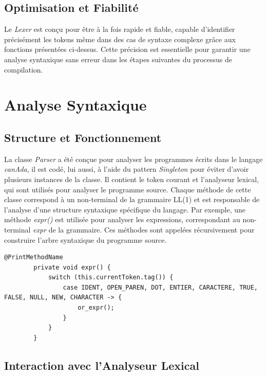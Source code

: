 \documentclass[french,a4paper]{article}
\begin{document}
    \subsection{Optimisation et Fiabilité}\label{subsec:optimisation-et-fiabilite}

    Le \textit{Lexer} est conçu pour être à la fois rapide et fiable, capable d'identifier précisément les tokens même dans des cas de syntaxe complexe grâce aux fonctions présentées ci-dessus.
    Cette précision est essentielle pour garantir une analyse syntaxique sans erreur dans les étapes suivantes du processus de compilation.

    \section{Analyse Syntaxique}\label{sec:analyse-syntaxique}

    \subsection{Structure et Fonctionnement}\label{subsec:structure-et-fonctionnement}

    La classe \textit{Parser} a été conçue pour analyser les programmes écrits dans le langage \textit{canAda}, il est codé, lui aussi, à l'aide du pattern \textit{Singleton} pour éviter d'avoir plusieurs instances de la classe.
    Il contient le token courant et l'analyseur lexical, qui sont utilisés pour analyser le programme source.
    Chaque méthode de cette classe correspond à un non-terminal de la grammaire LL(1) et est responsable de l'analyse d'une structure syntaxique spécifique du langage.
    Par exemple, une méthode \textit{expr()} est utilisée pour analyser les expressions, correspondant au non-terminal \textit{expr} de la grammaire.
    Ces méthodes sont appelées récursivement pour construire l'arbre syntaxique du programme source.

    \begin{lstlisting}[label={lst:lstlisting10}]
        @PrintMethodName
        private void expr() {
            switch (this.currentToken.tag()) {
                case IDENT, OPEN_PAREN, DOT, ENTIER, CARACTERE, TRUE, FALSE, NULL, NEW, CHARACTER -> {
                    or_expr();
                }
            }
        }
    \end{lstlisting}


    \subsection{Interaction avec l'Analyseur Lexical}\label{subsec:interaction-avec-l'analyseur-lexical}
\end{document}

